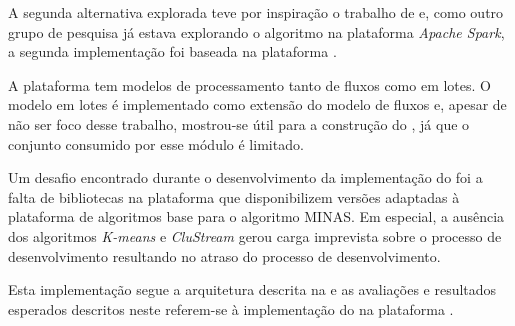 
A segunda alternativa explorada teve por inspiração o trabalho de
 e, como outro grupo de pesquisa já estava explorando
o algoritmo na plataforma \emph{Apache Spark}, a segunda implementação
foi baseada na plataforma \flink.

A plataforma \flink tem modelos de processamento tanto de fluxos como em lotes.
O modelo em lotes é implementado como extensão do modelo de fluxos e, apesar
de não ser foco desse trabalho, mostrou-se útil para a construção do \offline,
já que o conjunto consumido por esse módulo é limitado.

Um desafio encontrado durante o desenvolvimento da implementação do \mfog foi a falta
de bibliotecas na plataforma \flink que disponibilizem versões adaptadas
à plataforma de algoritmos base para o algoritmo MINAS.
Em especial, a ausência dos algoritmos \emph{K-means} e \emph{CluStream}
gerou carga imprevista sobre o processo de desenvolvimento
resultando no atraso do processo de desenvolvimento.

Esta implementação segue a arquitetura descrita na  e as
avaliações e resultados esperados descritos neste 
referem-se à implementação do \mfog na plataforma \flink.




